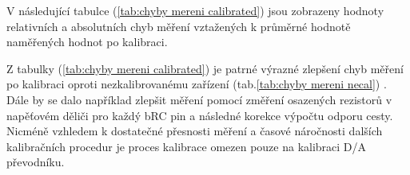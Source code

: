     \clearpage
    V následující tabulce (\ref{tab:chyby mereni calibrated}) jsou zobrazeny hodnoty relativních a absolutních chyb měření
    vztažených k průměrné hodnotě naměřených hodnot po kalibraci.

    \begin{table}[ht!]
        \centering
        \caption{Chyby měření po kalibraci odporů vůči pinu č. 1 nezkalibrované měřící karty}
        \label{tab:chyby mereni calibrated}
        \end{table}

    Z tabulky (\ref{tab:chyby mereni calibrated}) je patrné výrazné zlepšení chyb měření po kalibraci oproti nezkalibrovanému zařízení
    (tab.\ref{tab:chyby mereni necal}) .
    Dále by se dalo například zlepšit měření pomocí změření osazených rezistorů v napěťovém děliči pro každý bRC pin
    a následné korekce výpočtu odporu cesty. Nicméně vzhledem k dostatečné přesnosti
    měření a časové náročnosti dalších kalibračních procedur je proces kalibrace omezen pouze na kalibraci D/A převodníku.\par
